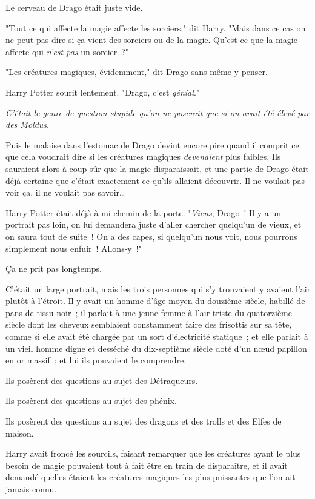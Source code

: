 Le cerveau de Drago était juste vide.

"Tout ce qui affecte la magie affecte les sorciers," dit Harry. "Mais dans ce cas on ne peut pas dire si ça vient des sorciers ou de la magie. Qu'est-ce que la magie affecte qui \emph{n'est pas} un sorcier~?"

"Les créatures magiques, évidemment," dit Drago sans même y penser.

Harry Potter sourit lentement. "Drago, c'est \emph{génial}."

\emph{C'était le genre de question stupide qu'on ne poserait que si on avait été élevé par des Moldus}.

Puis le malaise dans l'estomac de Drago devint encore pire quand il comprit ce que cela voudrait dire si les créatures magiques \emph{devenaient} plus faibles. Ils sauraient alors à coup sûr que la magie disparaissait, et une partie de Drago était déjà certaine que c'était exactement ce qu'ils allaient découvrir. Il ne voulait pas voir ça, il ne voulait pas savoir…

Harry Potter était déjà à mi-chemin de la porte. "\emph{Viens}, Drago~! Il y a un portrait pas loin, on lui demandera juste d'aller chercher quelqu'un de vieux, et on saura tout de suite~! On a des capes, si quelqu'un nous voit, nous pourrons simplement nous enfuir~! Allons-y~!"

\later

Ça ne prit pas longtemps.

C'était un large portrait, mais les trois personnes qui s'y trouvaient y avaient l'air plutôt à l'étroit. Il y avait un homme d'âge moyen du douzième siècle, habillé de pans de tissu noir~; il parlait à une jeune femme à l'air triste du quatorzième siècle dont les cheveux semblaient constamment faire des frisottis sur sa tête, comme si elle avait été chargée par un sort d'électricité statique~; et elle parlait à un vieil homme digne et desséché du dix-septième siècle doté d'un nœud papillon en or massif~; et lui ils pouvaient le comprendre.

Ils posèrent des questions au sujet des Détraqueurs.

Ils posèrent des questions au sujet des phénix.

Ils posèrent des questions au sujet des dragons et des trolls et des Elfes de maison.

Harry avait froncé les sourcils, faisant remarquer que les créatures ayant le plus besoin de magie pouvaient tout à fait être en train de disparaître, et il avait demandé quelles étaient les créatures magiques les plus puissantes que l'on ait jamais connu.

